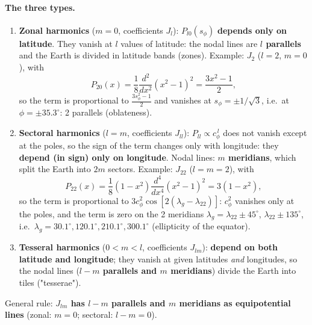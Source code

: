 \paragraph{The three types.}
\begin{enumerate}[label=(\alph*)]
\item \textbf{Zonal harmonics} ($m=0$, coefficients $J_l$): $P_{l0}(s_\phi)$ \textbf{depends only on latitude}. They vanish at $l$ values of latitude:
the nodal lines are \textbf{$l$ parallels} and the Earth is divided in latitude bands (zones). Example: $J_2$ ($l=2$, $m=0$), with
\begin{equation}
P_{20}(x)=\frac{1}{8}\frac{d^2}{dx^2}(x^2-1)^2=\frac{3x^2-1}{2},
\end{equation}
so the term is proportional to $\frac{3s_\phi^2-1}{2}$ and vanishes at $s_\phi=\pm1/\sqrt3$, i.e.\ at $\phi=\pm35.3^\circ$: 2 parallels
(oblateness).
\item \textbf{Sectoral harmonics} ($l=m$, coefficients $J_{ll}$): $P_{ll}\propto c_\phi^{\,l}$ does not vanish except at the poles, so the sign of the
term changes only with longitude: they \textbf{depend (in sign) only on longitude}. Nodal lines: \textbf{$m$ meridians}, which split the Earth
into $2m$ sectors. Example: $J_{22}$ ($l=m=2$), with
\begin{equation}
P_{22}(x)=\frac{1}{8}(1-x^2)\frac{d^4}{dx^4}(x^2-1)^2=3(1-x^2),
\end{equation}
so the term is proportional to $3c_\phi^2\cos[2(\lambda_g-\lambda_{22})]$: $c_\phi^2$ vanishes only at the poles, and the term is
zero on the 2 meridians $\lambda_g=\lambda_{22}\pm45^\circ$, $\lambda_{22}\pm135^\circ$, i.e.\ $\lambda_g=30.1^\circ,120.1^\circ,210.1^\circ,300.1^\circ$
(ellipticity of the equator).
\item \textbf{Tesseral harmonics} ($0<m<l$, coefficients $J_{lm}$): \textbf{depend on both latitude and longitude}; they vanish at given latitudes
\emph{and} longitudes, so the nodal lines (\textbf{$l-m$ parallels and $m$ meridians}) divide the Earth into tiles ("tesserae").
\end{enumerate}
General rule: \textbf{$J_{lm}$ has $l-m$ parallels and $m$ meridians as equipotential lines} (zonal: $m=0$; sectoral: $l-m=0$).

